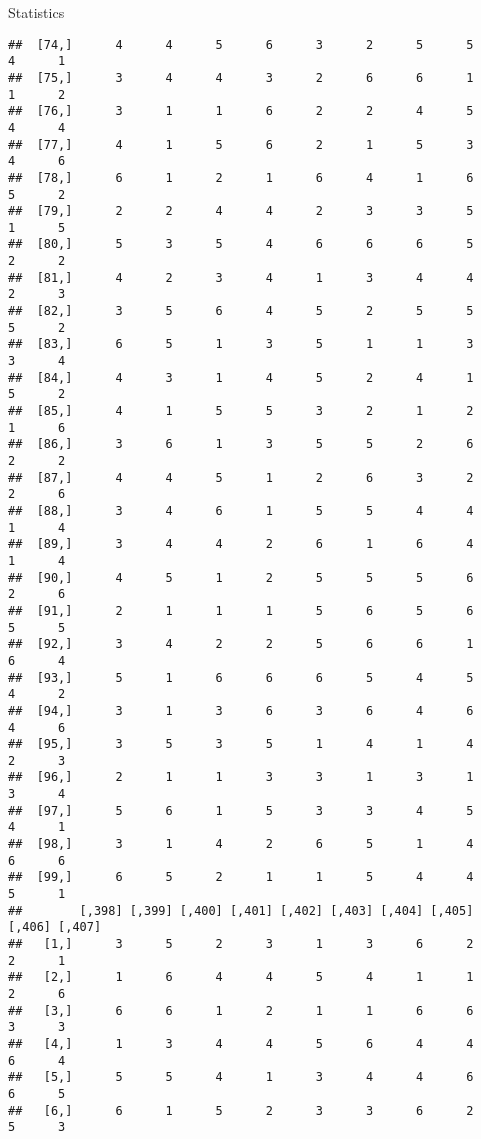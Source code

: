 \documentclass[
  ignorenonframetext,
]{beamer}
\begin{document}
\begin{frame}[fragile]{Statistics}
\begin{verbatim}
##  [74,]      4      4      5      6      3      2      5      5      4      1
##  [75,]      3      4      4      3      2      6      6      1      1      2
##  [76,]      3      1      1      6      2      2      4      5      4      4
##  [77,]      4      1      5      6      2      1      5      3      4      6
##  [78,]      6      1      2      1      6      4      1      6      5      2
##  [79,]      2      2      4      4      2      3      3      5      1      5
##  [80,]      5      3      5      4      6      6      6      5      2      2
##  [81,]      4      2      3      4      1      3      4      4      2      3
##  [82,]      3      5      6      4      5      2      5      5      5      2
##  [83,]      6      5      1      3      5      1      1      3      3      4
##  [84,]      4      3      1      4      5      2      4      1      5      2
##  [85,]      4      1      5      5      3      2      1      2      1      6
##  [86,]      3      6      1      3      5      5      2      6      2      2
##  [87,]      4      4      5      1      2      6      3      2      2      6
##  [88,]      3      4      6      1      5      5      4      4      1      4
##  [89,]      3      4      4      2      6      1      6      4      1      4
##  [90,]      4      5      1      2      5      5      5      6      2      6
##  [91,]      2      1      1      1      5      6      5      6      5      5
##  [92,]      3      4      2      2      5      6      6      1      6      4
##  [93,]      5      1      6      6      6      5      4      5      4      2
##  [94,]      3      1      3      6      3      6      4      6      4      6
##  [95,]      3      5      3      5      1      4      1      4      2      3
##  [96,]      2      1      1      3      3      1      3      1      3      4
##  [97,]      5      6      1      5      3      3      4      5      4      1
##  [98,]      3      1      4      2      6      5      1      4      6      6
##  [99,]      6      5      2      1      1      5      4      4      5      1
##        [,398] [,399] [,400] [,401] [,402] [,403] [,404] [,405] [,406] [,407]
##   [1,]      3      5      2      3      1      3      6      2      2      1
##   [2,]      1      6      4      4      5      4      1      1      2      6
##   [3,]      6      6      1      2      1      1      6      6      3      3
##   [4,]      1      3      4      4      5      6      4      4      6      4
##   [5,]      5      5      4      1      3      4      4      6      6      5
##   [6,]      6      1      5      2      3      3      6      2      5      3

\end{verbatim}
\end{frame}
\end{document}
